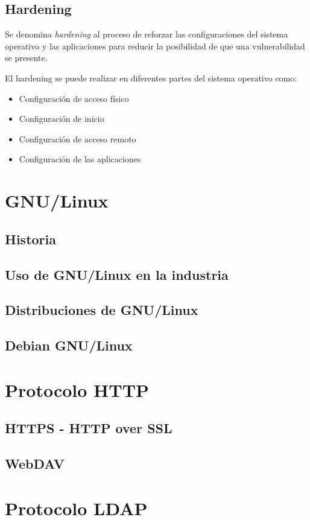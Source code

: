   \subsection {Hardening}

Se denomina \textit{hardening} al proceso de reforzar las configuraciones del sistema operativo y las aplicaciones para reducir la posibilidad de que una vulnerabilidad se presente.

El hardening se puede realizar en diferentes partes del sistema operativo como:

\begin{itemize}
  \item Configuraci\'{o}n de acceso f\'{i}sico
  \item Configuraci\'{o}n de inicio
  \item Configuraci\'{o}n de acceso remoto
  \item Configuraci\'{o}n de las aplicaciones
\end{itemize}

\section {GNU/Linux}
  \subsection {Historia}
  \subsection {Uso de GNU/Linux en la industria}
  \subsection {Distribuciones de GNU/Linux}
  \subsection {Debian GNU/Linux}
\section {Protocolo HTTP}
  \subsection {HTTPS - HTTP over SSL}
  \subsection {WebDAV}
\section {Protocolo LDAP}
